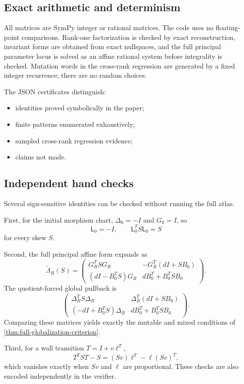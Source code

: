 \subsection{Exact arithmetic and determinism}

All matrices are SymPy integer or rational matrices.  The code uses no
floating-point comparisons.  Rank-one factorization is checked by exact
reconstruction, invariant forms are obtained from exact nullspaces, and the
full principal parameter locus is solved as an affine rational system before
integrality is checked.  Mutation words in the cross-rank regression are
generated by a fixed integer recurrence; there are no random choices.

The JSON certificates distinguish:
\begin{itemize}[leftmargin=2em]
\item identities proved symbolically in the paper;
\item finite patterns enumerated exhaustively;
\item sampled cross-rank regression evidence;
\item claims not made.
\end{itemize}

\subsection{Independent hand checks}

Several sign-sensitive identities can be checked without running the full
atlas.

First, for the initial morphism chart,
$\Delta_0=-I$ and $G_0=I$, so
\[
 \mathsf L_0=-I,
 \qquad
 \mathsf L_0^TS\mathsf L_0=S
\]
for every skew $S$.

Second, the full principal affine form expands as
\[
 \widetilde\Lambda_R(S)=
 \begin{pmatrix}
  G_R^TSG_R&-G_R^T(dI+SB_0)\\
  (dI-B_0^TS)G_R&dB_0^T+B_0^TSB_0
 \end{pmatrix}.
\]
The quotient-forced global pullback is
\[
 \begin{pmatrix}
  \Delta_R^TS\Delta_R&\Delta_R^T(dI+SB_0)\\
  (-dI+B_0^TS)\Delta_R&dB_0^T+B_0^TSB_0
 \end{pmatrix}.
\]
Comparing these matrices yields exactly the mutable and mixed conditions of
\cref{thm:full-globalization-criterion}.

Third, for a wall transition $T=I+v\ell^T$,
\[
 T^TST-S
 =(Sv)\ell^T-\ell(Sv)^T,
\]
which vanishes exactly when $Sv$ and $\ell$ are proportional.  These checks
are also encoded independently in the verifier.

